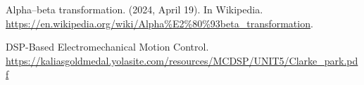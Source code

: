 Alpha–beta transformation. (2024, April 19). In Wikipedia. \url{https://en.wikipedia.org/wiki/Alpha%E2%80%93beta_transformation}.

DSP-Based Electromechanical Motion Control. \url{https://kaliasgoldmedal.yolasite.com/resources/MCDSP/UNIT5/Clarke_park.pdf}

